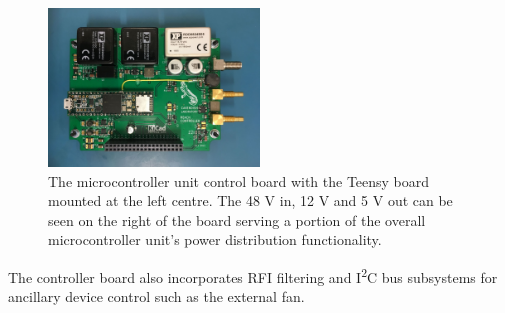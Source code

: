 \begin{figure}
    \centering
    \includegraphics[width=0.5\textwidth]{control_board}
    \caption{The microcontroller unit control board with the Teensy board mounted at the left centre. The 48 V in, 12 V and 5 V out can be seen on the right of the board serving a portion of the overall microcontroller unit's power distribution functionality.}
    \label{fig:control_board}
\end{figure}
The controller board also incorporates RFI filtering and I\textsuperscript{2}C bus subsystems for ancillary device control such as the external fan.


